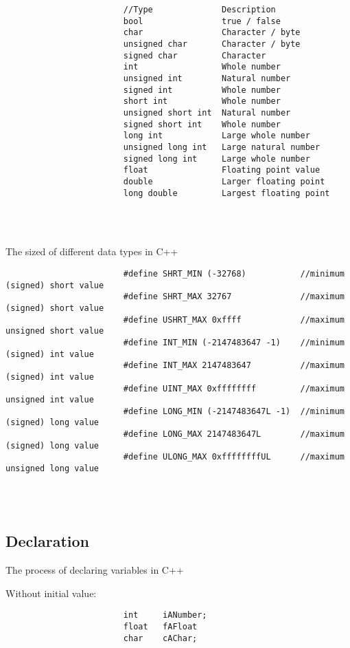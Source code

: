 \documentclass{report}
\begin{document}
				\begin{minipage}{\linewidth}
					\begin{lstlisting}
						//Type				Description
						bool				true / false
						char				Character / byte
						unsigned char		Character / byte
						signed char			Character
						int					Whole number
						unsigned int		Natural number
						signed int			Whole number
						short int			Whole number
						unsigned short int	Natural number
						signed short int	Whole number
						long int			Large whole number
						unsigned long int	Large natural number
						signed long int		Large whole number
						float				Floating point value
						double				Larger floating point
						long double			Largest floating point
					\end{lstlisting}
				\end{minipage}
				\\ \\
				
				\begin{minipage}{\linewidth}
					The sized of different data types in C++
					\begin{lstlisting}
						#define SHRT_MIN (-32768)			//minimum (signed) short value
						#define SHRT_MAX 32767				//maximum (signed) short value
						#define USHRT_MAX 0xffff        	//maximum unsigned short value
						#define INT_MIN (-2147483647 -1)	//minimum (signed) int value
						#define INT_MAX 2147483647			//maximum (signed) int value
						#define UINT_MAX 0xffffffff    		//maximum unsigned int value
						#define LONG_MIN (-2147483647L -1)	//minimum (signed) long value
						#define LONG_MAX 2147483647L		//maximum (signed) long value
						#define ULONG_MAX 0xffffffffUL		//maximum unsigned long value
					\end{lstlisting}
				\end{minipage}
				\\ \\
			
			
			\subsection{Declaration}
				The process of declaring variables in C++ \\
				
				\begin{minipage}{\linewidth}
					Without initial value:
					\begin{lstlisting}
						int		iANumber;
						float	fAFloat
						char	cAChar;
					\end{lstlisting}
				\end{minipage}
				\\ \\
				
\end{document}
